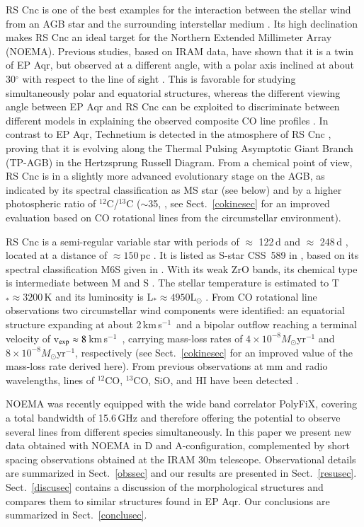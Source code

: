\documentclass{aa}
\newcommand{\kms}{\,km\,s$^{-1}$~}
\begin{document}
RS Cnc is one of the best examples for the interaction between the
stellar wind from an AGB star and the surrounding interstellar medium
\citep{hmwng14}.  Its high declination makes RS Cnc an ideal target
for the Northern Extended Millimeter Array (NOEMA).  Previous studies,
based on IRAM data, have shown that it is a twin of EP Aqr, but
observed at a different angle, with a polar axis inclined at about
30$^\circ$ with respect to the line of sight
\citep{lwlgm2010,hmwng14,nhwetal2015}.  This is favorable for studying
simultaneously polar and equatorial structures, whereas the different
viewing angle between EP Aqr and RS Cnc can be exploited to
discriminate between different models in explaining the observed
composite CO line profiles \citep{lhnw2016}.  In contrast to EP Aqr,
Technetium is detected in the atmosphere of RS Cnc \citep{lh99},
proving that it is evolving along the Thermal Pulsing Asymptotic Giant
Branch (TP-AGB) in the Hertzsprung Russell Diagram.  From a chemical
point of view, RS Cnc is in a slightly more advanced evolutionary
stage on the AGB, as indicated by its spectral classification as MS
star (see below) and by a higher photospheric ratio of
$^{12}$C/$^{13}$C ($\sim$35, \citet{sl86}, see Sect.~\ref{cokinesec}
for an improved evaluation  based on CO rotational lines from the
circumstellar environment).

RS Cnc is a semi-regular variable star with periods of $\approx$
122\,d and $\approx$ 248\,d \citep{ad2005}, located at a distance of
$\approx 150$\,pc \citep{GaiaeDR3,gaiabaylerjones2021}.  It is listed
as S-star CSS~589 in \citet{ste84}, based on its spectral
classification M6S given in \citet{kee54}. With its weak ZrO bands,
its chemical type is intermediate between M and S \citep{kee54}.  The
stellar temperature is estimated to T$_*\approx 3200$\,K and its
luminosity is L$_* \approx 4950 $L$_\odot$ \citep{ds98a}. From CO
rotational line observations two circumstellar wind components were
identified: an equatorial structure expanding at about 2\kms and a
bipolar outflow reaching a terminal velocity of v$_{\rm exp} \approx
8$\kms \citep{lwlgm2010,hmwng14}, carrying mass-loss rates of $4
\times 10^{-8} M_\odot$yr$^{-1}$ and $8 \times
10^{-8}M_\odot$yr$^{-1}$, respectively (see Sect.~\ref{cokinesec} for
an improved value of the mass-loss rate derived here). From previous
observations at mm and radio wavelengths, lines of $^{12}$CO,
$^{13}$CO, SiO, and HI have been detected
\citep{nbchhssvw92,dtjetal2015,dbdetal2016,gl2003,mr2007}.

NOEMA was recently equipped with the wide band correlator PolyFiX,
covering a total bandwidth of 15.6\,GHz and therefore offering the
potential to observe several lines from different species
simultaneously. In this paper we present new data obtained with NOEMA
in D and A-configuration, complemented by short spacing observations
obtained at the IRAM 30m telescope. Observational details are
summarized in Sect.~\ref{obssec} and our results are presented in
Sect.~\ref{resusec}. Sect.~\ref{discusec} contains a discussion of the
morphological structures and compares them to similar structures found
in EP Aqr. Our conclusions are summarized in Sect.~\ref{conclusec}.
\end{document}
